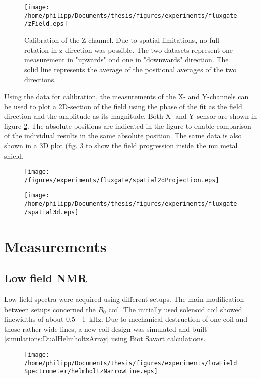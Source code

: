         \begin{figure}
            \label{fig:results:fluxgate:zcal}
            \centering
            \texttt{[image: /home/philipp/Documents/thesis/figures/experiments/fluxgate/zField.eps]}
            \caption[calibration results Z]{Calibration of the Z-channel. Due to spatial limitations, no full rotation in z direction was possible. The two datasets represent one measurement in "upwards" ond one in "downwards" direction. The solid line represents the average of the positional averages of the two directions.}
        \end{figure}
        Using the data for calibration, the measurements of the X- and Y-channels can be used to plot a 2D-section of the field using the phase of the fit as the field direction and the amplitude as its magnitude. Both X- and Y-sensor are shown in figure \ref{fig:results:fluxgate:plotSpatial2d}. The absolute positions are indicated in the figure to enable comparison of the individual results in the same absolute position. The same data is also shown in a 3D plot (fig. \ref{fig:results:fluxgate:plotSpatial3d} to show the field progression inside the mu metal shield.
        \begin{figure}
            \label{fig:results:fluxgate:plotSpatial2d}
            \centering
            \texttt{[image: /figures/experiments/fluxgate/spatial2dProjection.eps]}
        \end{figure}
        \begin{figure}
            \label{fig:results:fluxgate:plotSpatial3d}
            \centering
            \texttt{[image: /home/philipp/Documents/thesis/figures/experiments/fluxgate/spatial3d.eps]}
        \end{figure}
\section{Measurements}
    \subsection{Low field NMR}
    Low field spectra were acquired using different setups. The main modification between setups concerned the $B_0$ coil. The initially used solenoid coil showed linewidths of about 0.5 - \SI{1}{\kilo\hertz}. Due to mechanical destruction of one coil and those rather wide lines, a new coil design was simulated and built \ref{simulations:DualHelmholtzArray} using Biot Savart calculations.
    \begin{figure}
        \centering
    \end{figure}
    \begin{figure}
        \centering
        \texttt{[image: /home/philipp/Documents/thesis/figures/experiments/lowFieldSpectrometer/helmholtzNarrowLine.eps]}
    \end{figure}
